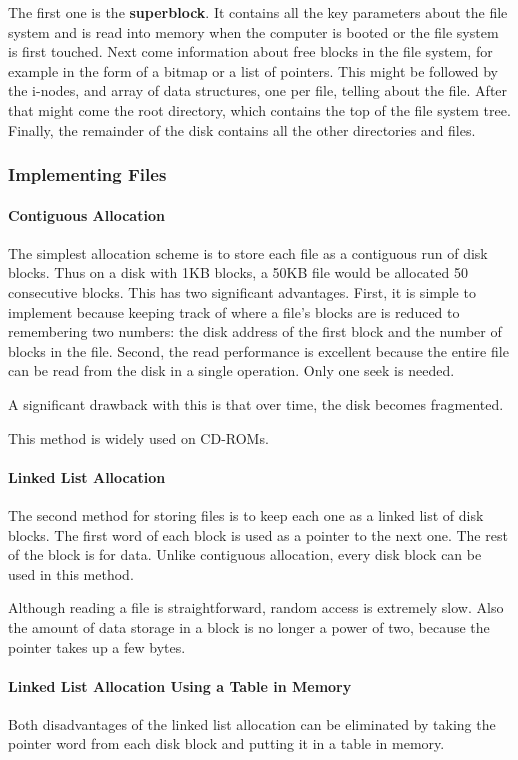 \documentclass[11pt,a4paper]{article}
\begin{document}
The first one is the \textbf{superblock}. It contains all the key parameters about the file system and is read into memory when the computer is booted or the file system is first touched. 
Next come information about free blocks in the file system, for example in the form of a bitmap or a list of pointers. This might be followed by the i-nodes, and array of data structures, one per file, telling about the file. After that might come the root directory, which contains the top of the file system tree. Finally, the remainder of the disk contains all the other directories and files.

\subsubsection{Implementing Files}
\paragraph{Contiguous Allocation}
The simplest allocation scheme is to store each file as a contiguous run of disk blocks. Thus on a disk with 1KB blocks, a 50KB file would be allocated 50 consecutive blocks. 
This has two significant advantages. First, it is simple to implement because keeping track of where a file's blocks are is reduced to remembering two numbers: the disk address of the first block and the number of blocks in the file. 
Second, the read performance is excellent because the entire file can be read from the disk in a single operation. Only one seek is needed. 

A significant drawback with this is that over time, the disk becomes fragmented.

This method is widely used on CD-ROMs.

\paragraph{Linked List Allocation}
The second method for storing files is to keep each one as a linked list of disk blocks. The first word of each block is used as a pointer to the next one. The rest of the block is for data. Unlike contiguous allocation, every disk block can be used in this method.

Although reading a file is straightforward, random access is extremely slow. Also the amount of data storage in a block is no longer a power of two, because the pointer takes up a few bytes. 

\paragraph{Linked List Allocation Using a Table in Memory}
Both disadvantages of the linked list allocation can be eliminated by taking the pointer word from each disk block and putting it in a table in memory. 
\end{document}
